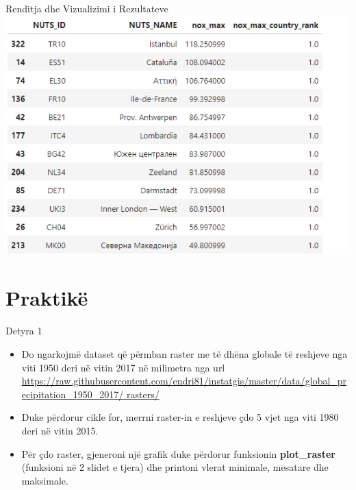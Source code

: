 \documentclass[
  ignorenonframetext,
]{beamer}
\begin{document}
\begin{frame}{Renditja dhe Vizualizimi i Rezultateve}
\protect\hypertarget{renditja-dhe-vizualizimi-i-rezultateve-14}{}
\includegraphics{./Figs/eunox4.png}
\end{frame}

\hypertarget{praktikuxeb}{%
\section{Praktikë}\label{praktikuxeb}}

\begin{frame}{Detyra 1}
\protect\hypertarget{detyra-1}{}
\begin{itemize}
\item
  Do ngarkojmë dataset që përmban raster me të dhëna globale të reshjeve
  nga viti 1950 deri në vitin 2017 në milimetra nga url
  \href{https://raw.githubusercontent.com/endri81/instatgis/master/data/global_precipitation_1950_2017/rasters/}{https://raw.githubusercontent.com/endri81/instatgis/master/data/global\_precipitation\_1950\_2017/
  rasters/}
\item
  Duke përdorur cikle for, merrni raster-in e reshjeve çdo 5 vjet nga
  viti 1980 deri në vitin 2015.
\item
  Për çdo raster, gjeneroni një grafik duke përdorur funksionin
  \textbf{plot\_raster} (funksioni në 2 slidet e tjera) dhe printoni
  vlerat minimale, mesatare dhe maksimale.
\end{itemize}
\end{frame}
\end{document}

